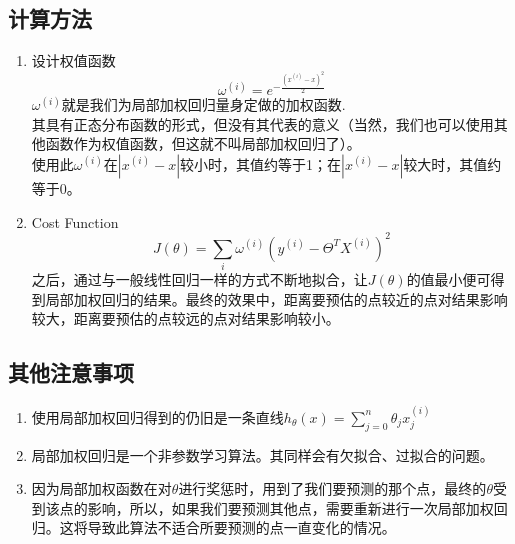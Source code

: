\subsection{计算方法}
\begin{enumerate}
	\item 设计权值函数
	\begin{equation}
		\omega^{(i)} = e^{-\frac{(x^{(i)}-x)^2}{2}}
	\end{equation}
	$\omega^{(i)}$就是我们为局部加权回归量身定做的加权函数. \\
	其具有正态分布函数的形式，但没有其代表的意义（当然，我们也可以使用其他函数作为权值函数，但这就不叫局部加权回归了）。\\
	使用此$\omega^{(i)}$在$|x^{(i)}-x|$较小时，其值约等于1；在$|x^{(i)}-x|$较大时，其值约等于0。\\
	\item Cost Function
	\begin{equation}
		J(\theta) = \sum_{i}\omega^{(i)}(y^{(i)} - \Theta^TX^{(i)})^2
	\end{equation}
	之后，通过与一般线性回归一样的方式不断地拟合，让$J(\theta)$的值最小便可得到局部加权回归的结果。最终的效果中，距离要预估的点较近的点对结果影响较大，距离要预估的点较远的点对结果影响较小。
	
\end{enumerate}

\subsection{其他注意事项}
\begin{enumerate}
	\item 使用局部加权回归得到的仍旧是一条直线$h_{\theta}(x)= \sum_{j=0}^n\theta_jx_j^{(i)}$
	\item 局部加权回归是一个非参数学习算法。其同样会有欠拟合、过拟合的问题。
	\item 因为局部加权函数在对$\theta$进行奖惩时，用到了我们要预测的那个点，最终的$\theta$受到该点的影响，所以，如果我们要预测其他点，需要重新进行一次局部加权回归。这将导致此算法不适合所要预测的点一直变化的情况。
\end{enumerate}







